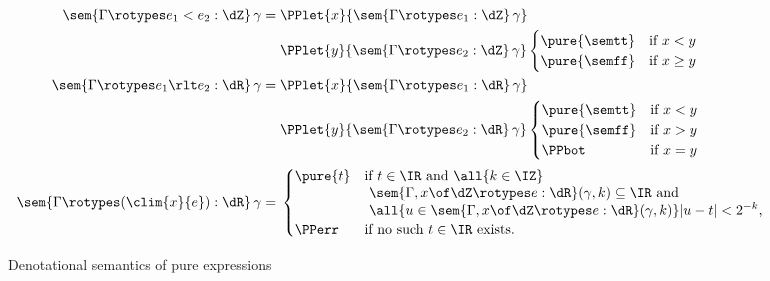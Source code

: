\begin{figure}
\begin{mdframed}
\begin{align*}
\\
  \sem{\Gamma \rotypes e_1 < e_2 : \dZ} \, \gamma = {}&
    \PPlet
    {x}
    {\sem{\Gamma \rotypes e_1 : \dZ}\,\gamma}
\\
& \PPlet
    {y}
    {\sem{\Gamma \rotypes e_2 : \dZ}\,\gamma}
    \begin{cases} 
    \pure{\semtt} & \text{if $x < y$} \\
    \pure{\semff} & \text{if $x \geq y$}
    \end{cases}
\\
   \sem{\Gamma \rotypes e_1 \rlt e_2 : \dR} \, \gamma = {}&
    \PPlet
    {x}
    {\sem{\Gamma \rotypes e_1 : \dR}\,\gamma} \\
    &\PPlet
    {y}
    {\sem{\Gamma \rotypes e_2 : \dR}\,\gamma}
    \begin{cases}
    \pure{\semtt} & \text{if $x < y$} \\
    \pure{\semff} & \text{if $x > y$} \\
    \PPbot &  \text{if $x = y$} 
    \end{cases}
  \\
  \sem{\Gamma \rotypes (\clim{x}{e}) : \dR}\,\gamma = {}&
  \begin{cases}
    \pure{t} &
      \begin{aligned}[t]
      &\text{if $t \in \IR$ and $\all{k \in \IZ}$} \\
      &\text{  $\sem{\Gamma, x \of \dZ \rotypes e : \dR} (\gamma, k) \subseteq \IR$ and} \\
      &\text{  $\all{u \in \sem{\Gamma, x \of \dZ \rotypes e : \dR} (\gamma, k)} |u - t| < 2^{-k}$,}
      \end{aligned}
    \\
    \PPerr   & \text{if no such $t \in \IR$ exists.}
  \end{cases}
\end{align*}
\end{mdframed}
\caption{Denotational semantics of pure expressions}
\label{figure:ro-denotations}
\end{figure}


